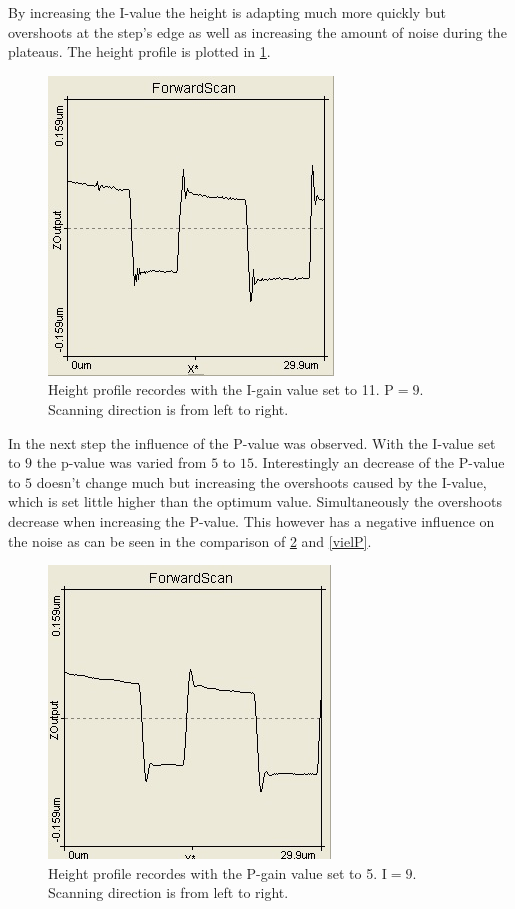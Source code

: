 \documentclass[paper=a4,fontsize=10pt,DIV=18,twocolumn,parskip=half]{scrartcl}
\numberwithin{equation}{section}    %
\begin{document}
By increasing the I-value the height is adapting much more quickly but 
overshoots at the step's edge as well as increasing the amount of noise during 
the plateaus. The height profile is plotted in \ref{vielI}.

\begin{figure}[htp]
    \begin{center}
        \includegraphics[width=0.6\columnwidth]{Bilder/vielI}
        \caption{Height profile recordes with the I-gain value set to 11. 
        $\mathrm{P}=9$. Scanning direction is from left to right.}
        \label{vielI}
    \end{center}
\end{figure}

In the next step the influence of the P-value was observed. With the I-value set 
to $9$ the p-value was varied from $5$ to $15$. Interestingly an decrease of the 
P-value to $5$ doesn't change much but increasing the overshoots caused by the 
I-value, which is set little higher than the optimum value. Simultaneously the 
overshoots decrease when increasing the P-value. This however has a negative 
influence on the noise as can be seen in the comparison of \ref{wenigP} and 
\ref{vielP}.

\begin{figure}[htp]
    \begin{center}
        \includegraphics[width=0.6\columnwidth]{Bilder/wenigP}
        \caption{Height profile recordes with the P-gain value set to 5. 
        $\mathrm{I}=9$. Scanning direction is from left to right.}
        \label{wenigP}
    \end{center}
\end{figure}
\end{document}
